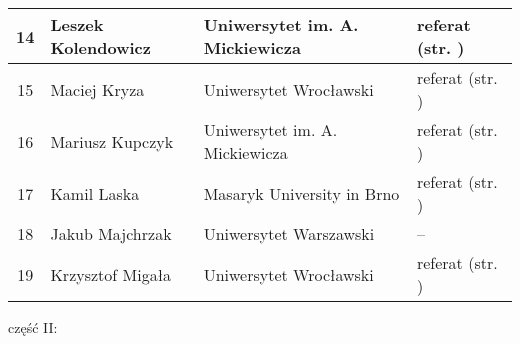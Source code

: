 \documentclass[12pt,oneside]{book}
\begin{document}
\begin{tabular}{||c|l|l|l||}
 14	 & Leszek Kolendowicz & Uniwersytet im. A. Mickiewicza & referat (str. \pageref{kolendowicz}) \\\hline
15 & Maciej Kryza & Uniwersytet Wrocławski & referat (str. \pageref{bilinska}) \\\hline
16 	& Mariusz Kupczyk & Uniwersytet im. A. Mickiewicza & referat (str. \pageref{kupczyk}) \\\hline
17    & Kamil Laska & Masaryk University in Brno & referat (str. \pageref{kendzierski}) \\\hline
18 	 & Jakub Majchrzak & Uniwersytet Warszawski & -- \\\hline	
19	 & Krzysztof Migała & Uniwersytet Wrocławski & referat (str. \pageref{pilguj}) \\\hline

	
\hline
\hline
\end{tabular}


\newpage

\vspace{1cm}

\Large część II:
\end{document}
